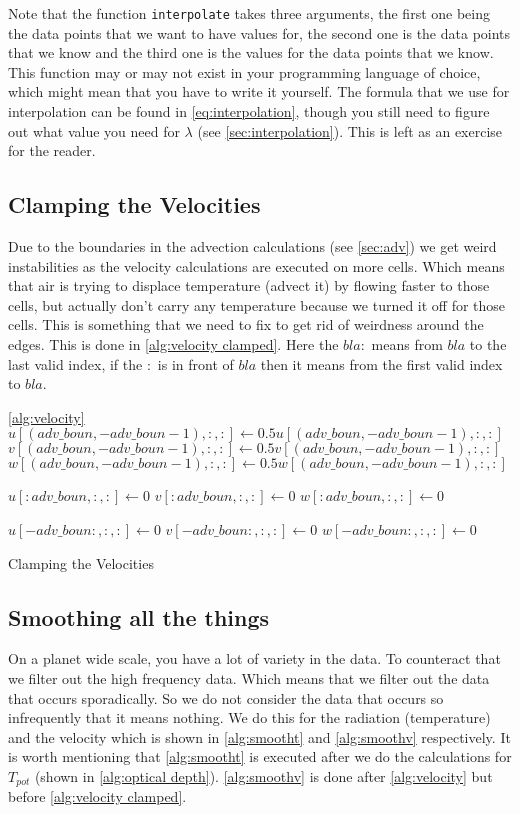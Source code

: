 Note that the function \texttt{interpolate} takes three arguments, the first one being the data points that we want to have values for, the second one is the data points that we know and the 
third one is the values for the data points that we know. This function may or may not exist in your programming language of choice, which might mean that you have to write it yourself. 
The formula that we use for interpolation can be found in \autoref{eq:interpolation}, though you still need to figure out what value you need for $\lambda$ (see \autoref{sec:interpolation}). 
This is left as an exercise for the reader.

\subsection{Clamping the Velocities}
Due to the boundaries in the advection calculations (see \autoref{sec:adv}) we get weird instabilities as the velocity calculations are executed on more cells. Which means that air is trying to 
displace temperature (advect it) by flowing faster to those cells, but actually don't carry any temperature because we turned it off for those cells. This is something that we need to fix to get 
rid of weirdness around the edges. This is done in \autoref{alg:velocity clamped}. Here the $bla:$ means from $bla$ to the last valid index, if the $:$ is in front of $bla$ then it means from 
the first valid index to $bla$.

\begin{algorithm}
    \autoref{alg:velocity}
    $u[(adv\_boun, -adv\_boun - 1), :, :] \leftarrow 0.5u[(adv\_boun, -adv\_boun - 1), :, :]$ \;
    $v[(adv\_boun, -adv\_boun - 1), :, :] \leftarrow 0.5v[(adv\_boun, -adv\_boun - 1), :, :]$ \;
    $w[(adv\_boun, -adv\_boun - 1), :, :] \leftarrow 0.5w[(adv\_boun, -adv\_boun - 1), :, :]$ \;

    $u[:adv\_boun, :, :] \leftarrow 0 $\;
    $v[:adv\_boun, :, :] \leftarrow 0 $\;
    $w[:adv\_boun, :, :] \leftarrow 0 $\;

    $u[-adv\_boun:, :, :] \leftarrow 0$ \;
    $v[-adv\_boun:, :, :] \leftarrow 0$ \;
    $w[-adv\_boun:, :, :] \leftarrow 0$ \;
    \caption{Clamping the Velocities}
    \label{alg:velocity clamped}
\end{algorithm}

\subsection{Smoothing all the things}
On a planet wide scale, you have a lot of variety in the data. To counteract that we filter out the high frequency data. Which means that we filter out the data that occurs sporadically. So we 
do not consider the data that occurs so infrequently that it means nothing. We do this for the radiation (temperature) and the velocity which is shown in \autoref{alg:smootht} and 
\autoref{alg:smoothv} respectively. It is worth mentioning that \autoref{alg:smootht} is executed after we do the calculations for $T_{pot}$ (shown in \autoref{alg:optical depth}). 
\autoref{alg:smoothv} is done after \autoref{alg:velocity} but before \autoref{alg:velocity clamped}. 


